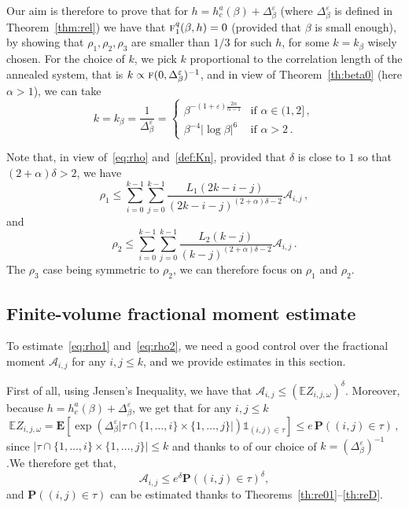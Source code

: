 \documentclass[AHL,Unicode,longabstracts]{cedram}
\newcommand{\ga}{\alpha}
\newcommand{\gb}{\beta}
\newcommand{\gd}{\delta}
\newcommand{\gep}{\varepsilon}
\newcommand{\gD}{\Delta}
\newcommand{\unbf}%
{\mathds{1}}
\newcommand{\tf}{\textsc{f}} %
\newcommand{\cA}{\ensuremath{\mathcal{A}}}
\newcommand{\bP}{\ensuremath{\mathbf{P}}}
\newcommand{\bE}{\ensuremath{\mathbf{E}}}
\newcommand{\bbE}{\ensuremath{\mathbb{E}}}
\begin{document}
Our aim is therefore to prove that for $h=h_c^a(\gb) + \gD_{\gb}^{\gep}$ (where $\gD_\gb^{\gep}$ is defined in Theorem~\ref{thm:rel}) we have that $\tf_1^{q}(\gb,h) =0$ (provided that $\gb$ is small enough), by showing that $\rho_1,\rho_2,\rho_3$ are smaller than $1/3$ for such $h$, for some $k=k_{\gb}$ wisely chosen. For the choice of $k$, we pick $k$ proportional to the correlation length of the annealed system, that is $k \propto \tf(0,\gD_{\gb}^{\gep})^{-1}$, and in view of Theorem~\ref{th:beta0} (here $\ga>1$), we can take
\begin{equation}\label{def:k}
k = k_{\gb} = \frac{1}{\gD_{\gb}^{\gep}} =
\begin{cases}
\gb^{ - (1+\gep)\frac{2\ga}{\ga-1} } &\text{if } \ga\in(1,2]\,, \\
\gb^{-4} |\log \gb |^{6} &\text{if } \ga>2\,.
\end{cases}
\end{equation}



Note that, in view of~\eqref{eq:rho} and~\eqref{def:Kn}, provided that $\gd$ is close to $1$ so that $(2+\ga)\gd >2$, we have
\begin{equation}\label{eq:rho1}
\rho_1 \le \sum_{i=0}^{k-1} \sum_{j=0}^{k-1} \frac{L_1(2 k -i -j)}{(2k -i -j)^{(2+\ga) \delta - 2}} \cA_{i,j}\,,
\end{equation}
and
\begin{equation}\label{eq:rho2}
\rho_2 \le \sum_{i=0}^{k-1} \sum_{j=0}^{k-1} \frac{L_2(k-j)}{(k-j)^{(2+\ga)\delta -2}} \cA_{i,j}\,.
\end{equation}
The $\rho_3$ case being symmetric to $\rho_2$, we can therefore focus on $\rho_1$ and $\rho_2$.


\subsection{Finite-volume fractional moment estimate}\label{sec:com}
To estimate~\eqref{eq:rho1} and~\eqref{eq:rho2}, we need a good control over the fractional moment $\cA_{i,j}$ for any $i,j\leq k$, and we provide estimates in this section.

First of all, using Jensen's Inequality, we have that $\cA_{i,j} \le { (\bbE Z_{i,j,\omega})}^\delta$. Moreover, because $h=h_c^a(\gb)+\gD_{\gb}^\gep$, we get that for any $i,j\leq k$
\[
\bbE Z_{i,j,\omega} = \bE \left[\exp \left(\gD_{\gb}^{\gep} \vert \tau \cap \lbrace 1,\dots,i \rbrace \times \lbrace 1,\dots, j \rbrace \vert \right) \unbf_{(i,j)\in \tau} \right] \le e\,\bP((i,j) \in \tau)\,,
\]
since $\vert \tau \cap \lbrace 1,\dots,i \rbrace \times \lbrace 1,\dots, j \rbrace \vert \leq k$ and thanks to of our choice of $k = (\gD_{\gb}^{\gep})^{-1}$.\linebreak We therefore get that,
\begin{equation}\label{eq:ineqA}
\cA_{i,j} \leq e^{\gd} \bP((i,j) \in \tau)^{\gd},
\end{equation}
and $\bP((i,j)\in\tau)$ can be estimated thanks to Theorems~\ref{th:re01}--\ref{th:reD}.
\end{document}
